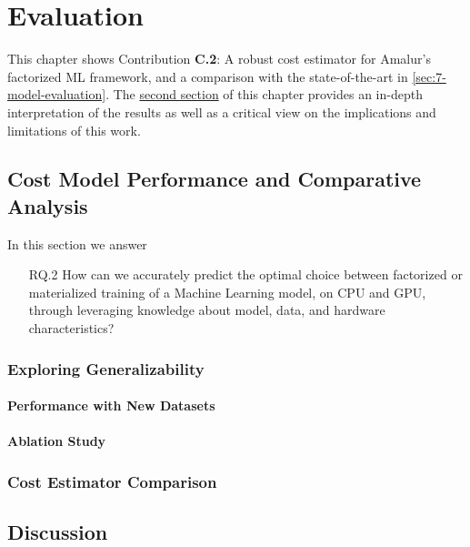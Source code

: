
\chapter{Evaluation}
\label{chapter:evaluation-discussion}
This chapter shows Contribution \textbf{C.2}: A robust cost estimator for Amalur's factorized ML framework, and a comparison with the state-of-the-art in \autoref{sec:7-model-evaluation}. The \hyperref[sec:7-discussion]{second section} of this chapter provides an in-depth interpretation of the results as well as a critical view on the implications and limitations of this work.

\section{Cost Model Performance and Comparative Analysis}
\label{sec:7-model-evaluation}

In this section we answer
\begin{itemize}
    \item[RQ.2] How can we accurately predict the optimal choice between factorized or materialized training of a Machine Learning model, on CPU and GPU, through leveraging knowledge about model, data, and hardware characteristics?
\end{itemize}

\subsection{Exploring Generalizability}
\subsubsection{Performance with New Datasets}

\subsubsection{Ablation Study}


\subsection{Cost Estimator Comparison}


\section{Discussion}
\label{sec:7-discussion}

